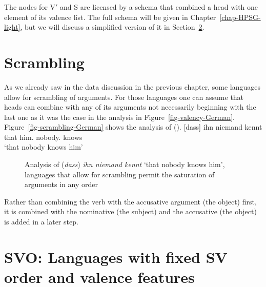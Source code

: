 The nodes for V$'$ and S are licensed by a schema that combined a head with one element of its
valence list. The full schema will be given in Chapter~\ref{chap-HPSG-light}, but we will discuss a
simplified version of it in Section~\ref{sec-intro-schemata}.


\section{Scrambling}
\label{sec-scrambling}

As we already saw in the data discussion in the previous chapter, some languages allow for
scrambling of arguments. For those languages one can assume that heads can combine with any of its
arguments not necessarily beginning with the last one as it was the case in the analysis in Figure~\ref{fig-valency-German}.
Figure~\vref{fig-scrambling-German} shows the analysis of ().
\ea
\gll {}[dass] ihn niemand kennt\\
     \spacebr{}that him.\ACC{} nobody.\NOM{} knows\\
\glt `that nobody knows him'
\z
\begin{figure}
\caption{\label{fig-scrambling-German}Analysis of (\emph{dass}) \emph{ihn niemand kennt} `that nobody
  knows him', languages that allow for scrambling permit the saturation of arguments in any order}
\end{figure}
Rather than combining the verb with the accusative argument (the object) first, it is combined with
the nominative (the subject) and the accusative (the object) is added in a later step.


\section{SVO: Languages with fixed SV order and valence features}
\label{sec-intro-schemata}
\label{sec-intro-spr-comps}

